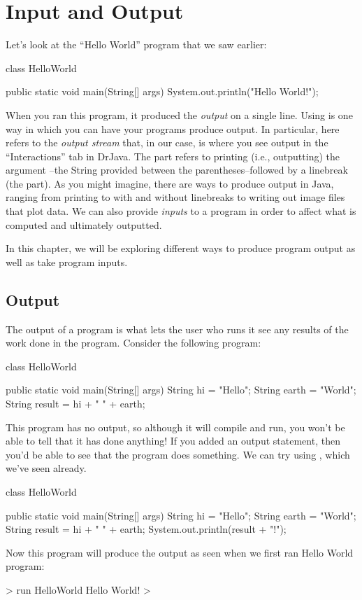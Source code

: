 \chapter{Input and Output}

Let's look at the ``Hello World'' program that we saw earlier:
\begin{code}
class HelloWorld {

    public static void main(String[] args) {
        System.out.println("Hello World!");
    }

}
\end{code}

When you ran this program, it produced the \emph{output}  on a single line.
Using  is one way in which you can have your programs
produce output. In particular, here  refers to the \emph{output stream}
that, in our case, is where you see output in the ``Interactions'' tab in DrJava.
The  part refers to printing (i.e., outputting) the argument
--the String provided between the parentheses--followed by a linebreak (the  part).
As you might imagine, there are ways to produce output in Java, ranging from printing
to  with and without linebreaks to writing out image files that
plot data. We can also provide \emph{inputs} to a program in order
to affect what is computed and ultimately outputted.

In this chapter, we will be exploring different ways to produce program output
as well as take program inputs.

\section{Output}
The output of a program is what lets the user who runs it
see any results of the work done in the program.
Consider the following program:
\begin{code}
class HelloWorld {

    public static void main(String[] args) {
        String hi = "Hello";
        String earth = "World";
        String result = hi + " " + earth;
    }

}
\end{code}
This program has no output, so although it will compile and run, you won't
be able to tell that it has done anything!
If you added an output statement, then you'd be able to see that
the program does something. We can try using ,
which we've seen already.
\begin{code}
class HelloWorld {

    public static void main(String[] args) {
        String hi = "Hello";
        String earth = "World";
        String result = hi + " " + earth;
        System.out.println(result + "!");
    }

}
\end{code}
Now this program will produce the output as seen when we first ran Hello World program:
\begin{code}
> run HelloWorld
Hello World!
>
\end{code}

